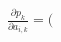 \documentclass[preview]{standalone}
\begin{document}
\begin{align*}
\frac{\partial p_k}{\partial a_{i,k}} = (
\end{align*}
\end{document}
